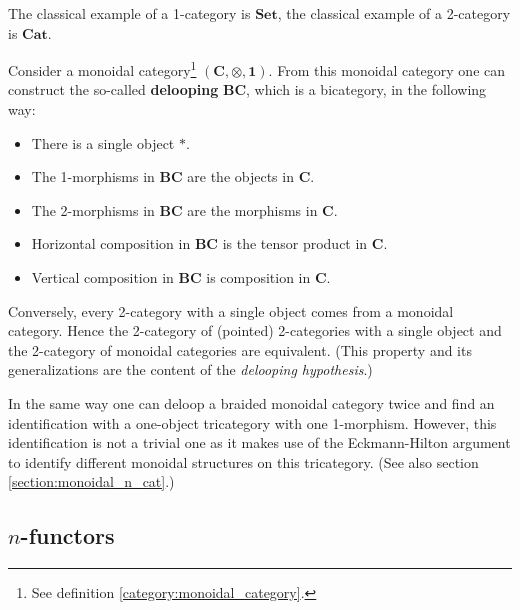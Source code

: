     \begin{example}
        The classical example of a 1-category is $\mathbf{Set}$, the classical example of a 2-category is $\mathbf{Cat}$.
    \end{example}


    \begin{property}\label{cat:monoidal_or_2}
        Consider a monoidal category\footnote{See definition \ref{category:monoidal_category}.} $(\mathbf{C},\otimes,\mathbf{1})$. From this monoidal category one can construct the so-called \textbf{delooping} $\mathbf{BC}$, which is a bicategory, in the following way:
        \begin{itemize}
            \item There is a single object $\ast$.
            \item The 1-morphisms in $\mathbf{BC}$ are the objects in $\mathbf{C}$.
            \item The 2-morphisms in $\mathbf{BC}$ are the morphisms in $\mathbf{C}$.
            \item Horizontal composition in $\mathbf{BC}$ is the tensor product in $\mathbf{C}$.
            \item Vertical composition in $\mathbf{BC}$ is composition in $\mathbf{C}$.
        \end{itemize}
        Conversely, every 2-category with a single object comes from a monoidal category. Hence the 2-category of (pointed) 2-categories with a single object and the 2-category of monoidal categories are equivalent. (This property and its generalizations are the content of the \textit{delooping hypothesis}.)

        In the same way one can deloop a braided monoidal category twice and find an identification with a one-object tricategory with one 1-morphism. However, this identification is not a trivial one as it makes use of the Eckmann-Hilton argument to identify different monoidal structures on this tricategory. (See also section \ref{section:monoidal_n_cat}.)
    \end{property}

\subsection{\texorpdfstring{$n$-functors}{n-functors}}

